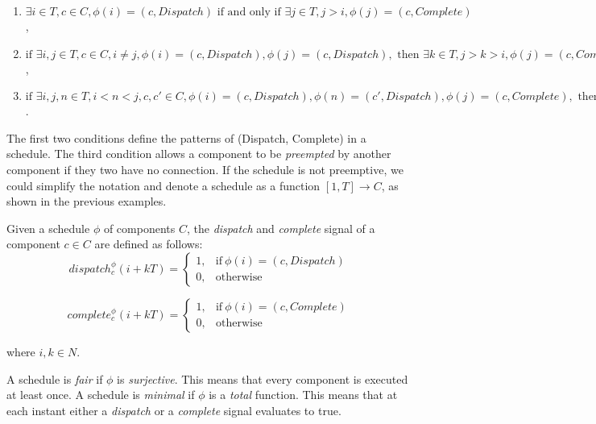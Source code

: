 \begin{enumerate}
	\item $ \exists i\in T, c\in C, \phi(i) = (c, Dispatch) \text{ if and only if } \exists j\in T, j > i, \phi(j) =  (c, Complete) $,
	\item $ \text{if } \exists i, j\in T, c\in C, i \neq j, \phi(i) = (c, Dispatch), \phi(j) = (c, Dispatch), \text{ then } \exists k\in T, j >k> i, \phi(j) =  (c, Complete) $,
	\item $ \text{if } \exists i, j, n\in T, i < n < j, c, c'\in C, \phi(i) = (c, Dispatch), \phi(n) = (c', Dispatch), \phi(j) = (c, Complete), \text{ then } c, c' \text{ are not connected, and }\exists m\in T, n < m < j, \phi(m) =  (c', Complete) $.
\end{enumerate}

The first two conditions define the patterns of (Dispatch, Complete) in a schedule. 
The third condition allows a component to be \emph{preempted} by another component if they two have no connection.
If the schedule is not preemptive, we could simplify the notation and denote a schedule as a function $[1, T] \rightarrow C$, as shown in the previous examples.

Given a schedule $\phi$ of components $C$, the \emph{dispatch} and \emph{complete} signal of a component $c \in C$ are defined as follows: 
\begin{equation}
\label{eqn:dispatch}
    dispatch_c^\phi(i+kT) =
    \begin{cases}
      1, & \text{if}\ \phi(i) = (c, Dispatch) \\
      0, & \text{otherwise}
    \end{cases}
\end{equation}

\begin{equation}
\label{eqn:complete}
    complete_c^\phi(i+kT) =
    \begin{cases}
      1, & \text{if}\ \phi(i) = (c, Complete) \\
      0, & \text{otherwise}
    \end{cases}
\end{equation}

where $i,k\in N$. 

A schedule is \emph{fair} if $\phi$ is \emph{surjective}. This means that every component is executed at least once.
A schedule is \emph{minimal} if $\phi$ is a \emph{total} function. This means that at each instant either a \emph{dispatch} or a \emph{complete} signal evaluates to true. 

